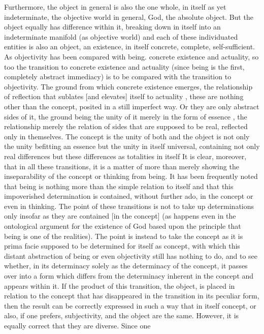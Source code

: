 Furthermore, the object in general is also the one whole,
in itself as yet indeterminate, the objective world in general,
God, the absolute object.
But the object equally has difference within it, breaking
down in itself into an indeterminate manifold (as objective world)
and each of these individuated entities is also an object, an existence,
in itself concrete, complete, self-sufficient.
As objectivity has been compared with being. concrete existence
and actuality, so too the transition to concrete existence
and actuality (since being is the first, completely abstract
immediacy) is to be compared with the transition to objectivity.
The ground from which concrete existence emerges, the relationship
of reflection that sublates [and elevates] itself to actuality ,
these are nothing other than the concept,
posited in a still imperfect way. Or they are only abstract sides of it,
the ground being the unity of it merely in the form of essence ,
the relationship merely the relation of sides that are
supposed to be real, reflected only in themselves. The concept is the
unity of both and the object is not only the unity befitting an
essence but the unity in itself universal, containing not only real
differences but these differences as totalities in itself
It is clear, moreover, that in all these transitions, it is a matter
of more than merely showing the inseparability of the concept or
thinking from being. It has been frequently noted that being is
nothing more than the simple relation to itself and that this
impoverished determination is contained, without further ado, in
the concept or even in thinking. The point of these transitions is not
to take up determinations only insofar as they are contained [in the
concept] (as happens even in the ontological argument for the
existence of God based upon the principle that being is one of the
realities). The point is instead to take the concept as it is prima facie
supposed to be determined for itself as concept, with which this
distant abstraction of being or even objectivity still has nothing to
do, and to see whether, in its determinacy solely as the determinacy
of the concept, it passes over into a form which differs from the
determinacy inherent in the concept and appears within it.
If the product of this transition, the object, is placed in relation to
the concept that has disappeared in the transition in its peculiar
form, then the result can be correctly expressed in such a way that in
itself concept, or also, if one prefers, subjectivity, and the object are
the same. However, it is equally correct that they are diverse. Since one

